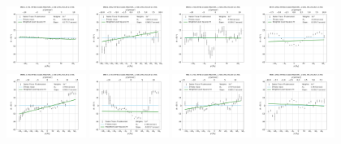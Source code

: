 \documentclass[fleqn,usenatbib]{mnras}
\begin{document}
\begin{figure}
    \includegraphics[width=0.23\textwidth]{Images/WLSFITS/CPSB/8941-3701.png}
    \includegraphics[width=0.23\textwidth]{Images/WLSFITS/CPSB/8944-1902.png}
    \includegraphics[width=0.23\textwidth]{Images/WLSFITS/CPSB/8950-3704.png}
    \includegraphics[width=0.23\textwidth]{Images/WLSFITS/CPSB/8979-1902.png}
    \includegraphics[width=0.23\textwidth]{Images/WLSFITS/CPSB/8996-3704.png}
    \includegraphics[width=0.23\textwidth]{Images/WLSFITS/CPSB/8997-3703.png}
    \includegraphics[width=0.23\textwidth]{Images/WLSFITS/CPSB/9047-3701.png}
    \includegraphics[width=0.23\textwidth]{Images/WLSFITS/CPSB/9085-1902.png}

\end{figure}
\end{document}
